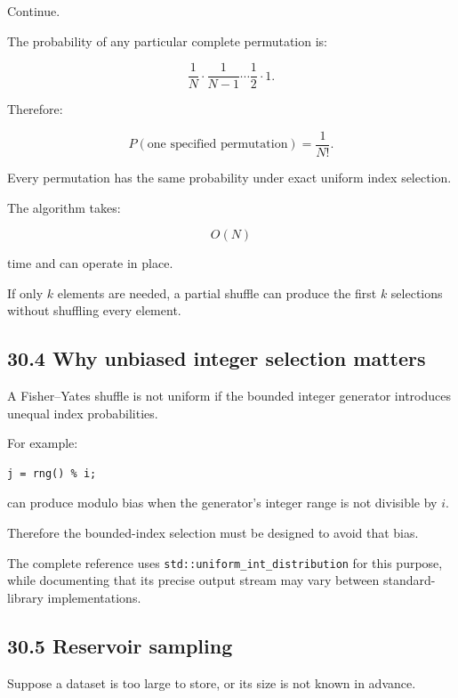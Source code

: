 Continue.

The probability of any particular complete permutation is:

\[ \frac1N \cdot \frac1{N-1} \cdots \frac12 \cdot1. \]

Therefore:

\[ \boxed{ P(\text{one specified permutation})=\frac1{N!} }. \]

Every permutation has the same probability under exact uniform index selection.

The algorithm takes:

\[ \boxed{O(N)} \]

time and can operate in place.

If only \(k\) elements are needed, a partial shuffle can produce the first \(k\) selections without shuffling every element.

\subsection{30.4 Why unbiased integer selection matters}\label{02-foundations-ii-ch031-why-unbiased-integer-selection-matters}

\hypertarget{02-foundations-ii-ch031-why-unbiased-integer-selection-matters}{}

A Fisher--Yates shuffle is not uniform if the bounded integer generator introduces unequal index probabilities.

For example:

\begin{verbatim}
j = rng() % i;
\end{verbatim}

can produce modulo bias when the generator's integer range is not divisible by \(i\).

Therefore the bounded-index selection must be designed to avoid that bias.

The complete reference uses \texttt{std::uniform\_int\_distribution} for this purpose, while documenting that its precise output stream may vary between standard-library implementations.

\subsection{30.5 Reservoir sampling}\label{02-foundations-ii-ch031-reservoir-sampling}

\hypertarget{02-foundations-ii-ch031-reservoir-sampling}{}

Suppose a dataset is too large to store, or its size is not known in advance.

